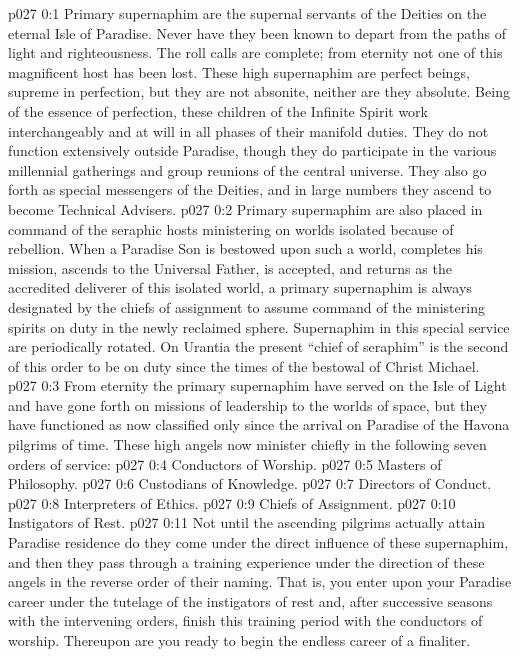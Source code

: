 \author{Perfector of Wisdom}
\vs p027 0:1 Primary supernaphim are the supernal servants of the Deities on the eternal Isle of Paradise. Never have they been known to depart from the paths of light and righteousness. The roll calls are complete; from eternity not one of this magnificent host has been lost. These high supernaphim are perfect beings, supreme in perfection, but they are not absonite, neither are they absolute. Being of the essence of perfection, these children of the Infinite Spirit work interchangeably and at will in all phases of their manifold duties. They do not function extensively outside Paradise, though they do participate in the various millennial gatherings and group reunions of the central universe. They also go forth as special messengers of the Deities, and in large numbers they ascend to become Technical Advisers.
\vs p027 0:2 Primary supernaphim are also placed in command of the seraphic hosts ministering on worlds isolated because of rebellion. When a Paradise Son is bestowed upon such a world, completes his mission, ascends to the Universal Father, is accepted, and returns as the accredited deliverer of this isolated world, a primary supernaphim is always designated by the chiefs of assignment to assume command of the ministering spirits on duty in the newly reclaimed sphere. Supernaphim in this special service are periodically rotated. On Urantia the present “chief of seraphim” is the second of this order to be on duty since the times of the bestowal of Christ Michael.
\vs p027 0:3 From eternity the primary supernaphim have served on the Isle of Light and have gone forth on missions of leadership to the worlds of space, but they have functioned as now classified only since the arrival on Paradise of the Havona pilgrims of time. These high angels now minister chiefly in the following seven orders of service:
\vs p027 0:4 \bibnobreakspace Conductors of Worship.
\vs p027 0:5 \bibnobreakspace Masters of Philosophy.
\vs p027 0:6 \bibnobreakspace Custodians of Knowledge.
\vs p027 0:7 \bibnobreakspace Directors of Conduct.
\vs p027 0:8 \bibnobreakspace Interpreters of Ethics.
\vs p027 0:9 \bibnobreakspace Chiefs of Assignment.
\vs p027 0:10 \bibnobreakspace Instigators of Rest.
\vs p027 0:11 Not until the ascending pilgrims actually attain Paradise residence do they come under the direct influence of these supernaphim, and then they pass through a training experience under the direction of these angels in the reverse order of their naming. That is, you enter upon your Paradise career under the tutelage of the instigators of rest and, after successive seasons with the intervening orders, finish this training period with the conductors of worship. Thereupon are you ready to begin the endless career of a finaliter.

